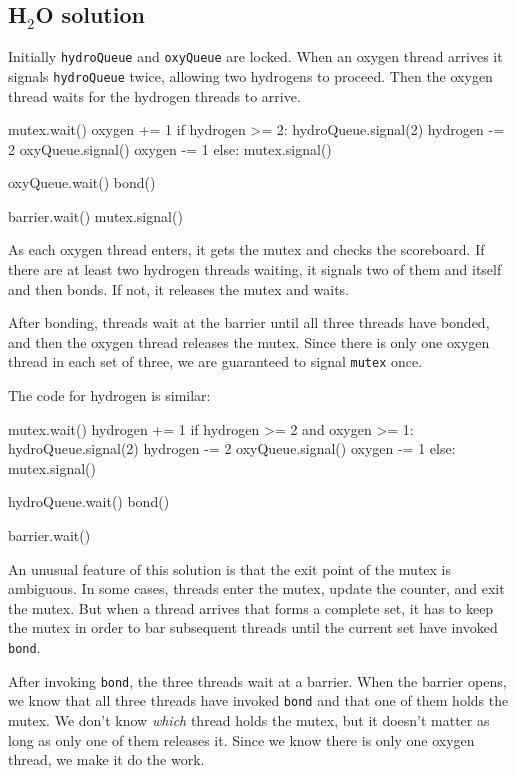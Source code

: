 \documentclass{book}
\begin{document}
\subsection {H$_2$O solution}

Initially {\tt hydroQueue} and {\tt oxyQueue} are locked.  When
an oxygen thread arrives it signals {\tt hydroQueue} twice,
allowing two hydrogens to proceed.  Then the oxygen thread waits
for the hydrogen threads to arrive.

\begin{unbreakable}[title={Oxygen code}]{}
mutex.wait()
oxygen += 1
if hydrogen >= 2:
    hydroQueue.signal(2)
    hydrogen -= 2
    oxyQueue.signal()
    oxygen -= 1
else:
    mutex.signal()

oxyQueue.wait()
bond()

barrier.wait()
mutex.signal()
\end{unbreakable}

As each oxygen thread enters, it gets the mutex and checks the scoreboard.
If there are at least two hydrogen threads waiting, it signals two of
them and itself and then bonds.  If not, it releases the mutex and
waits.

After bonding, threads wait at the barrier until all three threads
have bonded, and then the oxygen thread releases the mutex.  Since
there is only one oxygen thread in each set of three, we are guaranteed
to signal {\tt mutex} once.

The code for hydrogen is similar:

\begin{unbreakable}[title={Hydrogen code}]{}
mutex.wait()
hydrogen += 1
if hydrogen >= 2 and oxygen >= 1:
    hydroQueue.signal(2)
    hydrogen -= 2
    oxyQueue.signal()
    oxygen -= 1
else:
    mutex.signal()

hydroQueue.wait()
bond()

barrier.wait()
\end{unbreakable}

An unusual feature of this solution is that
the exit point of the mutex is ambiguous.  In
some cases, threads enter the mutex, update the counter, and exit the
mutex.  But when a thread arrives that forms a complete set, it has to
keep the mutex in order to bar subsequent threads until the current
set have invoked {\tt bond}.

After invoking {\tt bond}, the three threads wait at a barrier.
When the barrier opens, we know that all three threads have invoked
    {\tt bond} and that one of them holds the mutex.  We don't know
    {\em which} thread holds the mutex, but it doesn't matter as long
as only one of them releases it.  Since we know there is only one
oxygen thread, we make it do the work.
\end{document}
